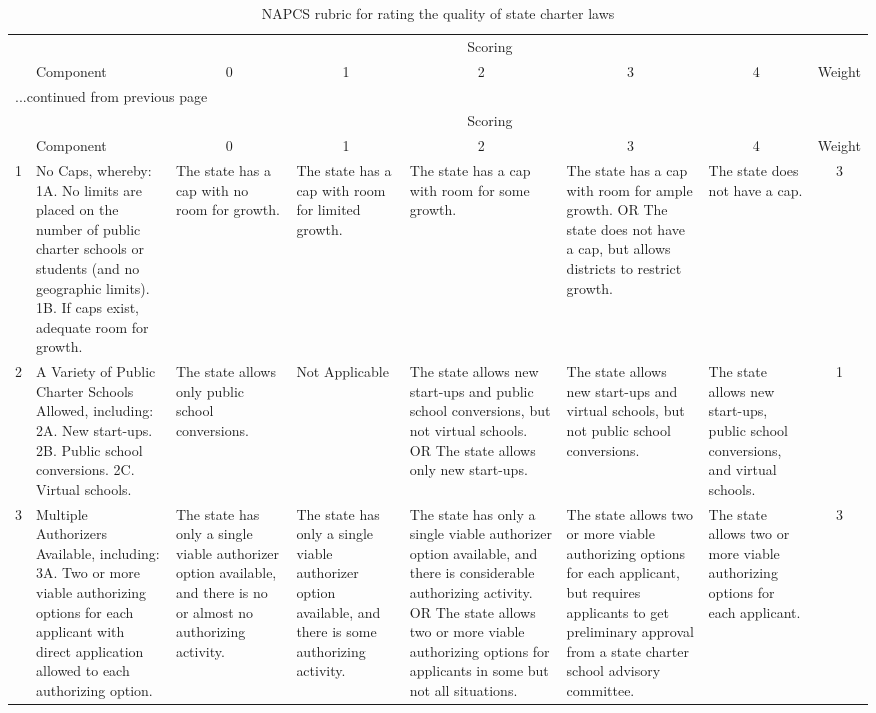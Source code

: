 {\smaller
\begin{longtable}{rp{2.2in}p{0.9in}p{0.9in}p{0.9in}p{0.9in}p{0.9in}c}
\caption{NAPCS rubric for rating the quality of state charter laws} \\ 
   \hline & & \multicolumn{5}{c}{Scoring} & \\ \cline{3-7}& Component & \multicolumn{1}{c}{0} & \multicolumn{1}{c}{1} & \multicolumn{1}{c}{2} & \multicolumn{1}{c}{3} & \multicolumn{1}{c}{4} & Weight \\ \hline\endfirsthead \multicolumn{8}{l}{{...continued from previous page}}\\ \hline & & \multicolumn{5}{c}{Scoring} & \\ \cline{3-7}& Component & \multicolumn{1}{c}{0} & \multicolumn{1}{c}{1} & \multicolumn{1}{c}{2} & \multicolumn{1}{c}{3} & \multicolumn{1}{c}{4} & Weight \\ \hline \endhead   1 & No Caps, whereby: 1A. No limits are placed on the number of public charter schools or students (and no geographic limits). 1B. If caps exist, adequate room for growth.  & The state has a cap with no room for growth.  & The state has a cap with room for limited growth.  & The state has a cap with room for some growth.  & The state has a cap with room for ample growth. OR The state does not have a cap, but allows districts to restrict growth.  & The state does not have a cap. &   3 \\ 
   \hline
  2 & A Variety of Public Charter Schools Allowed, including: 2A. New start-ups. 2B. Public school conversions. 2C. Virtual schools.  & The state allows only public school conversions.  & Not Applicable  & The state allows new start-ups and public school conversions, but not virtual schools. OR The state allows only new start-ups.  & The state allows new start-ups and virtual schools, but not public school conversions.  & The state allows new start-ups, public school conversions, and virtual schools.  &   1 \\ 
   \hline
  3 & Multiple Authorizers Available, including: 3A. Two or more viable authorizing options for each applicant with direct application allowed to each authorizing option.  & The state has only a single viable authorizer option available, and there is no or almost no authorizing activity.  & The state has only a single viable authorizer option available, and there is some authorizing activity.  & The state has only a single viable authorizer option available, and there is considerable authorizing activity. OR The state allows two or more viable authorizing options for applicants in some but not all situations.  & The state allows two or more viable authorizing options for each applicant, but requires applicants to get preliminary approval from a state charter school advisory committee.  & The state allows two or more viable authorizing options for each applicant.  &   3 \\ 

\end{longtable}}
